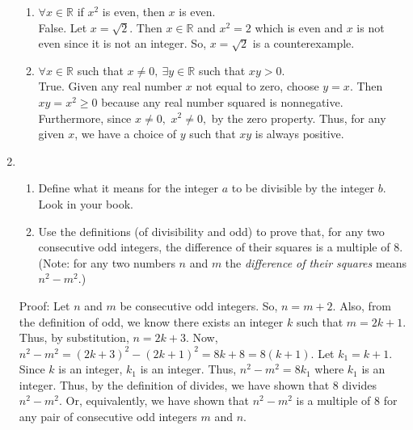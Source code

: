 \documentclass[12pt]{article}
\begin{document}
\begin{enumerate}
\begin{enumerate}
\item $\forall x \in \mathbb{R}$ if $x^2$ is even, then $x$ is even.\\
False. Let $x=\sqrt{2}.$ Then $x \in \mathbb{R}$ and $x^2=2$ which is even and $x$ is not even since it is not an integer. So, $x=\sqrt{2}$ is a counterexample.
\item $\forall x \in \mathbb{R}$ such that $x \not = 0, \: \exists y \in \mathbb{R}$ such that $xy > 0.$\\
True. Given any real number $x$ not equal to zero, choose $y=x.$ Then $xy=x^2 \geq 0$ because any real number squared is nonnegative. Furthermore, since $x \not =0,$ $x^2 \not = 0,$ by the zero property. Thus, for any given $x$, we have a choice of $y$ such that $xy$ is always positive.
\end{enumerate}
\item \begin{enumerate}
 \item  Define what it means for the integer $a$ to be divisible by the integer $b.$\\
 Look in your book.

 \item  Use the definitions (of divisibility and odd) to prove that, for any two consecutive odd integers, the difference of their squares is a multiple of 8. (Note: for any two numbers $n$ and $m$ the \emph{difference of their squares} means $n^2-m^2.$)
     \end{enumerate}
     
     Proof: Let $n$ and $m$ be consecutive odd integers. So, $n=m+2.$ Also, from the definition of odd,  we know there exists an integer $k$ such that $m=2k+1.$ Thus, by substitution, $n=2k+3.$ Now, $n^2-m^2=(2k+3)^2-(2k+1)^2=8k+8=8(k+1).$ Let $k_1=k+1.$ Since $k$ is an integer, $k_1$ is an integer. Thus, $n^2-m^2=8k_1$ where $k_1$ is an integer. Thus, by the definition of divides, we have shown that 8 divides $n^2-m^2.$ Or, equivalently, we have shown that $n^2-m^2$ is a multiple of 8 for any pair of consecutive odd integers $m$ and $n$.


\end{enumerate}
\end{document}
